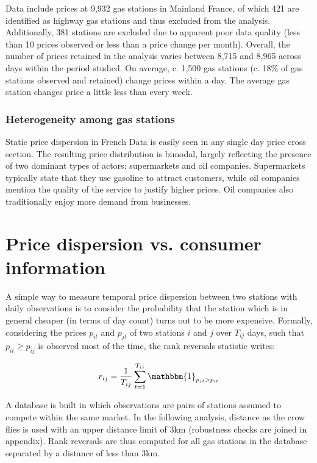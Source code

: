 \documentclass[english]{article}
\begin{document}
Data include prices at 9,932 gas stations in Mainland France, of which 421 are identified as highway gas stations and thus excluded from the analysis. Additionally, 381 stations are excluded due to apparent poor data quality (less than 10 prices observed or less than a price change per month). Overall, the number of prices retained in the analysis varies between 8,715 and 8,965 across days within the period studied. On average, c. 1,500 gas stations (c. 18\% of gas stations observed and retained) change prices within a day. The average gas station changes price a little less than every week.

\subsubsection{Heterogeneity among gas stations}

Static price dispersion in French Data is easily seen in any single day price cross section. The resulting price distribution is bimodal, largely reflecting the presence of two dominant types of actors: supermarkets and oil companies. Supermarkets typically state that they use gasoline to attract customers, while oil companies mention the quality of the service to justify higher prices. Oil companies also traditionally enjoy more demand from businesses.

\section{Price dispersion vs. consumer information}

A simple way to measure temporal price dispersion between two stations with daily observations is to consider the probability that the station which is in general cheaper (in terms of day count) turns out to be more expensive. Formally, considering the prices $p_{it}$ and $p_{jt}$ of two stations $i$ and $j$ over $T_{ij}$ days, such that $p_{it} \ge p_{ij}$ is observed most of the time, the rank reversals statistic writes:

\begin{align*}
r_{ij} = \frac{1}{T_{ij}} \sum_{t=1}^{T_{ij}} \mathbbm{1}_{p_{jt} > p_{it}}
\end{align*}

A database is built in which observations are pairs of stations assumed to compete within the same market. In the following analysis, distance as the crow flies is used with an upper distance limit of 3km (robustness checks are joined in appendix). Rank reversals are thus computed for all gas stations in the database separated by a distance of less than 3km.
\end{document}
